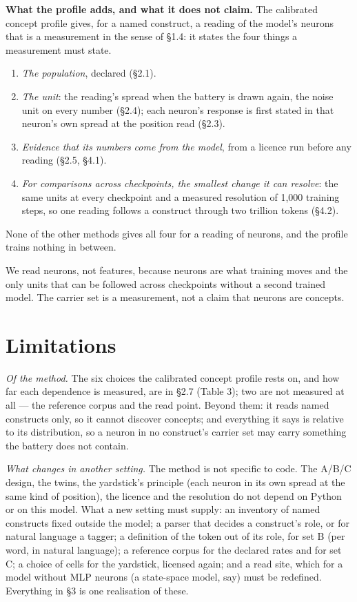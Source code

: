 \documentclass{article}
\begin{document}
\textbf{What the profile adds, and what it does not claim.} The calibrated concept profile gives, for a named construct, a reading of the model's neurons that is a measurement in the sense of \S1.4: it states the four things a measurement must state.
\begin{enumerate}[topsep=2pt,itemsep=1pt,parsep=0pt,partopsep=0pt,leftmargin=*]
\item \emph{The population}, declared (\S2.1).
\item \emph{The unit}: the reading's spread when the battery is drawn again, the noise unit on every number (\S2.4); each neuron's response is first stated in that neuron's own spread at the position read (\S2.3).
\item \emph{Evidence that its numbers come from the model}, from a licence run before any reading (\S2.5, \S4.1).
\item \emph{For comparisons across checkpoints, the smallest change it can resolve}: the same units at every checkpoint and a measured resolution of 1,000 training steps, so one reading follows a construct through two trillion tokens (\S4.2).
\end{enumerate}

None of the other methods gives all four for a reading of neurons, and the profile trains nothing in between.

We read neurons, not features, because neurons are what training moves and the only units that can be followed across checkpoints without a second trained model. The carrier set is a measurement, not a claim that neurons are concepts.

\section{Limitations}

\emph{Of the method.} The six choices the calibrated concept profile rests on, and how far each dependence is measured, are in \S2.7 (Table 3); two are not measured at all --- the reference corpus and the read point. Beyond them: it reads named constructs only, so it cannot discover concepts; and everything it says is relative to its distribution, so a neuron in no construct's carrier set may carry something the battery does not contain.

\emph{What changes in another setting.} The method is not specific to code. The A/B/C design, the twins, the yardstick's principle (each neuron in its own spread at the same kind of position), the licence and the resolution do not depend on Python or on this model. What a new setting must supply: an inventory of named constructs fixed outside the model; a parser that decides a construct's role, or for natural language a tagger; a definition of the token out of its role, for set B (per word, in natural language); a reference corpus for the declared rates and for set C; a choice of cells for the yardstick, licensed again; and a read site, which for a model without MLP neurons (a state-space model, say) must be redefined. Everything in \S3 is one realisation of these.
\end{document}
